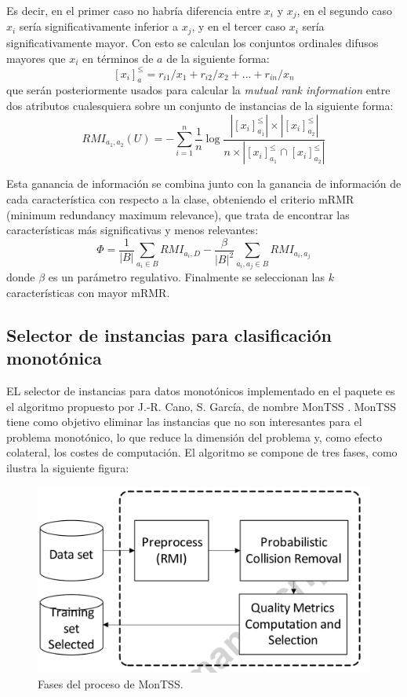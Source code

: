 Es decir, en el primer caso no habría diferencia entre $x_i$ y $x_j$, en el segundo caso $x_i$ sería significativamente inferior a $x_j$, y en el tercer caso $x_i$ sería significativamente mayor. \newline
Con esto se calculan los conjuntos ordinales difusos mayores que $x_i$ en términos de $a$ de la siguiente forma:
$$[x_i]_a^{\leq}=r_{i1}/x_1 + r_{i2}/x_2 +...+r_{in}/x_n$$
que serán posteriormente usados para calcular la \textit{mutual rank information} entre dos atributos cualesquiera sobre un conjunto de instancias de la siguiente forma: 
$$RMI_{a_1,a_2}(U)= -\sum_{i=1}^{n} \frac{1}{n} \log \frac{| [x_i]_{a_1}^{\leq}| \times |[x_i]_{a_2}^{\leq}|  }{ n \times | [x_i]_{a_1}^{\leq} \cap [x_i]_{a_2}^{\leq} |}$$

Esta ganancia de información se combina junto con la ganancia de información de cada característica con respecto a la clase, obteniendo el criterio mRMR (minimum redundancy maximum relevance), que trata de encontrar las características más significativas y menos relevantes:
$$\Phi=\frac{1}{|B|} \sum_{a_i \in B} RMI_{a_i,D} - \frac{\beta}{|B|^2} \sum_{a_i, a_j \in B} RMI_{a_i,a_j} $$ 
donde $\beta$ es un parámetro regulativo. Finalmente se seleccionan las \textit{$k$} características con mayor mRMR.
\subsection{Selector de instancias para clasificación monotónica}
EL selector de instancias para datos monotónicos implementado en el paquete es el algoritmo propuesto por J.-R. Cano, S. García, de nombre MonTSS \cite{cano2017training}. \newline
 MonTSS tiene como objetivo eliminar las instancias que no son interesantes para el problema monotónico, lo que reduce la dimensión del problema y, como efecto colateral, los costes de computación. El algoritmo se compone de tres fases, como ilustra la siguiente figura:
 \begin{figure}[h]
 \includegraphics[width=\textwidth]{figures/montss}
 \caption[Short figure name.]{Fases del proceso de MonTSS.
\label{fig:myInlineFigure}}
 \end{figure}

